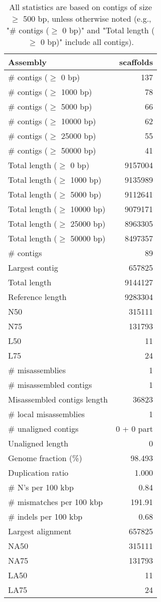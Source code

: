 \documentclass[12pt,a4paper]{article}
\begin{document}
\begin{table}[ht]
\begin{center}
\caption{All statistics are based on contigs of size $\geq$ 500 bp, unless otherwise noted (e.g., "\# contigs ($\geq$ 0 bp)" and "Total length ($\geq$ 0 bp)" include all contigs).}
\begin{tabular}{|l*{1}{|r}|}
\hline
Assembly & scaffolds \\ \hline
\# contigs ($\geq$ 0 bp) & 137 \\ \hline
\# contigs ($\geq$ 1000 bp) & 78 \\ \hline
\# contigs ($\geq$ 5000 bp) & 66 \\ \hline
\# contigs ($\geq$ 10000 bp) & 62 \\ \hline
\# contigs ($\geq$ 25000 bp) & 55 \\ \hline
\# contigs ($\geq$ 50000 bp) & 41 \\ \hline
Total length ($\geq$ 0 bp) & 9157004 \\ \hline
Total length ($\geq$ 1000 bp) & 9135989 \\ \hline
Total length ($\geq$ 5000 bp) & 9112641 \\ \hline
Total length ($\geq$ 10000 bp) & 9079171 \\ \hline
Total length ($\geq$ 25000 bp) & 8963305 \\ \hline
Total length ($\geq$ 50000 bp) & 8497357 \\ \hline
\# contigs & 89 \\ \hline
Largest contig & 657825 \\ \hline
Total length & 9144127 \\ \hline
Reference length & 9283304 \\ \hline
N50 & 315111 \\ \hline
N75 & 131793 \\ \hline
L50 & 11 \\ \hline
L75 & 24 \\ \hline
\# misassemblies & 1 \\ \hline
\# misassembled contigs & 1 \\ \hline
Misassembled contigs length & 36823 \\ \hline
\# local misassemblies & 1 \\ \hline
\# unaligned contigs & 0 + 0 part \\ \hline
Unaligned length & 0 \\ \hline
Genome fraction (\%) & 98.493 \\ \hline
Duplication ratio & 1.000 \\ \hline
\# N's per 100 kbp & 0.84 \\ \hline
\# mismatches per 100 kbp & 191.91 \\ \hline
\# indels per 100 kbp & 0.68 \\ \hline
Largest alignment & 657825 \\ \hline
NA50 & 315111 \\ \hline
NA75 & 131793 \\ \hline
LA50 & 11 \\ \hline
LA75 & 24 \\ \hline
\end{tabular}
\end{center}
\end{table}
\end{document}
